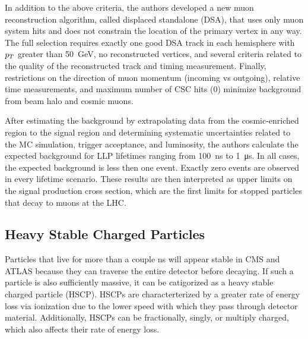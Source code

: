 \documentclass[12pt]{article}
\begin{document}
    In addition to the above criteria, the authors developed a new muon reconstruction algorithm, called displaced standalone (DSA), that uses only muon system hits and does not constrain the location of the primary vertex in any way. The full selection requires exactly one good DSA track in each hemisphere with $p_T$ greater than \SI{50}{\giga\electronvolt}, no reconstructed vertices, and several criteria related to the quality of the reconstructed track and timing measurement. Finally, restrictions on the direction of muon momentum (incoming vs outgoing), relative time measurements, and maximum number of CSC hits (0) minimize background from beam halo and cosmic muons.

    After estimating the background by extrapolating data from the cosmic-enriched region to the signal region and determining systematic uncertainties related to the MC simulation, trigger acceptance, and luminosity, the authors calculate the expected background for LLP lifetimes ranging from \SI{100}{\nano\s} to \SI{1}{\micro\s}. In all cases, the expected background is less then one event. Exactly zero events are observed in every lifetime scenario. These results are then interpreted as upper limits on the signal production cross section, which are the first limits for stopped particles that decay to muons at the LHC.

\subsection{Heavy Stable Charged Particles}
    Particles that live for more than a couple ns  will appear stable in CMS and ATLAS because they can traverse the entire detector before decaying. If such a particle is also sufficiently massive, it can be catigorized as a heavy stable charged particle (HSCP). HSCPs are characterterized by a greater rate of energy loss via ionization due to the lower speed with which they pass through detector material. Additionally, HSCPs can be fractionally, singly, or multiply charged, which also affects their rate of energy loss. 
\end{document}
